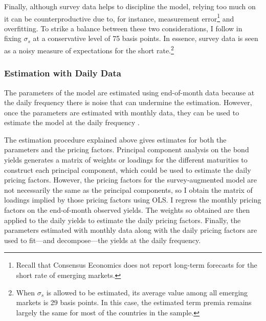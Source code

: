 {Finally, although survey data helps to discipline the model, relying too much on it can be counterproductive due to, for instance, measurement error\footnote{ Recall that Consensus Economics does not report long-term forecasts for the short rate of emerging markets.} and overfitting. 
To strike a balance between these two considerations, I follow \cite{KimOrphanides:2012} in fixing \(\sigma_s\) at a conservative level of 75 basis points. 
In essence, survey data is seen as a noisy measure of expectations for the short rate.\footnote{ When \(\sigma_s\) is allowed to be estimated, its average value among all emerging markets is 29 basis points.
In this case, the estimated term premia remains largely the same for most of the countries in the sample.}

\subsubsection{Estimation with Daily Data}
\iftoggle{toclinks}{\gototoc}{} %
The parameters of the model are estimated using end-of-month data because at the daily frequency there is noise that can undermine the estimation. 
However, once the parameters are estimated with monthly data, they can be used to estimate the model at the daily frequency \citep{ACM:2013}.

The estimation procedure explained above gives estimates for both the parameters and the pricing factors.
Principal component analysis on the bond yields generates a matrix of weights or loadings for the different maturities to construct each principal component, which could be used to estimate the daily pricing factors.
However, the pricing factors for the survey-augmented model are not necessarily the same as the principal components, so I obtain the matrix of loadings implied by those pricing factors using OLS.
I regress the monthly pricing factors on the end-of-month observed yields.
The weights so obtained are then applied to the daily yields to estimate the daily pricing factors.
Finally, the parameters estimated with monthly data along with the daily pricing factors are used to fit---and decompose---the yields at the daily frequency.

}
